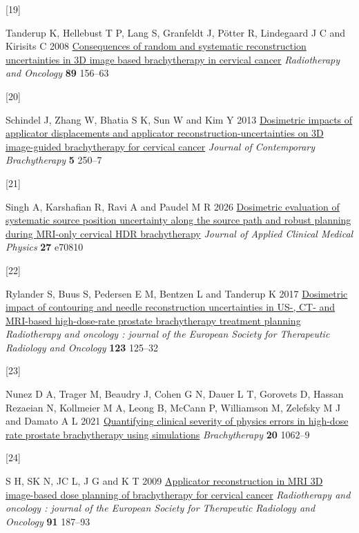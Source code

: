 \documentclass[
  11pt,
]{article}
\newlength{\cslhangindent}
\newlength{\csllabelwidth}
\newenvironment{CSLReferences}[2] %
 {\begin{list}{}{%
  \setlength{\itemindent}{0pt}
  \setlength{\leftmargin}{0pt}
  \setlength{\parsep}{0pt}
  \ifodd #1
   \setlength{\leftmargin}{\cslhangindent}
   \setlength{\itemindent}{-1\cslhangindent}
  \fi
  \setlength{\itemsep}{#2\baselineskip}}}
 {\end{list}}
\newcommand{\CSLLeftMargin}[1]{\parbox[t]{\csllabelwidth}{\strut#1\strut}}
\newcommand{\CSLRightInline}[1]{\parbox[t]{\linewidth - \csllabelwidth}{\strut#1\strut}}
\begin{document}
\begin{CSLReferences}{0}{1}
\CSLLeftMargin{{[}19{]} }%
\CSLRightInline{Tanderup K, Hellebust T P, Lang S, Granfeldt J, Pötter
R, Lindegaard J C and Kirisits C 2008
\href{https://doi.org/10.1016/j.radonc.2008.06.010}{Consequences of
random and systematic reconstruction uncertainties in {3D} image based
brachytherapy in cervical cancer} \emph{Radiotherapy and Oncology}
\textbf{89} 156--63}

\CSLLeftMargin{{[}20{]} }%
\CSLRightInline{Schindel J, Zhang W, Bhatia S K, Sun W and Kim Y 2013
\href{https://doi.org/10.5114/jcb.2013.39453}{Dosimetric impacts of
applicator displacements and applicator reconstruction-uncertainties on
{3D} image-guided brachytherapy for cervical cancer} \emph{Journal of
Contemporary Brachytherapy} \textbf{5} 250--7}

\CSLLeftMargin{{[}21{]} }%
\CSLRightInline{Singh A, Karshafian R, Ravi A and Paudel M R 2026
\href{https://doi.org/10.1002/acm2.70810}{Dosimetric evaluation of
systematic source position uncertainty along the source path and robust
planning during {MRI}-only cervical {HDR} brachytherapy} \emph{Journal
of Applied Clinical Medical Physics} \textbf{27} e70810}

\CSLLeftMargin{{[}22{]} }%
\CSLRightInline{Rylander S, Buus S, Pedersen E M, Bentzen L and Tanderup
K 2017 \href{https://doi.org/10.1016/j.radonc.2017.01.007}{Dosimetric
impact of contouring and needle reconstruction uncertainties in US-, CT-
and MRI-based high-dose-rate prostate brachytherapy treatment planning}
\emph{Radiotherapy and oncology : journal of the European Society for
Therapeutic Radiology and Oncology} \textbf{123} 125--32}

\CSLLeftMargin{{[}23{]} }%
\CSLRightInline{Nunez D A, Trager M, Beaudry J, Cohen G N, Dauer L T,
Gorovets D, Hassan Rezaeian N, Kollmeier M A, Leong B, McCann P,
Williamson M, Zelefsky M J and Damato A L 2021
\href{https://doi.org/10.1016/j.brachy.2021.05.007}{Quantifying clinical
severity of physics errors in high-dose rate prostate brachytherapy
using simulations} \emph{Brachytherapy} \textbf{20} 1062--9}

\CSLLeftMargin{{[}24{]} }%
\CSLRightInline{S H, SK N, JC L, J G and K T 2009
\href{https://doi.org/10.1016/j.radonc.2008.09.002}{Applicator
reconstruction in MRI 3D image-based dose planning of brachytherapy for
cervical cancer} \emph{Radiotherapy and oncology : journal of the
European Society for Therapeutic Radiology and Oncology} \textbf{91}
187--93}


\end{CSLReferences}
\end{document}
